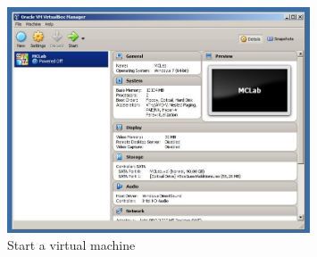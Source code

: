 \documentclass[a4paper,twoside,english]{report}
\begin{document}
\begin{figure}
\centering\includegraphics[width=0.8\textwidth]{fig/VMBox3}

\caption{Start a virtual machine \label{fig: VMBoxstart} }
\end{figure}
\end{document}
